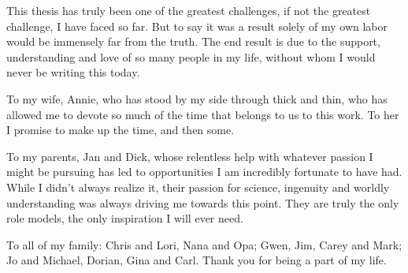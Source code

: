 
This thesis has truly been one of the greatest challenges, if not the greatest challenge, I have faced so far. But to say it was a result solely of my own labor would be immensely far from the truth. The end result is due to the support, understanding and love of so many people in my life, without whom I would never be writing this today.

To my wife, Annie, who has stood by my side through thick and thin, who has allowed me to devote so much of the time that belongs to us to this work. To her I promise to make up the time, and then some.

To my parents, Jan and Dick, whose relentless help with whatever passion I might be pursuing has led to opportunities I am incredibly fortunate to have had. While I didn't always realize it, their passion for science, ingenuity and worldly understanding was always driving me towards this point. They are truly the only role models, the only inspiration I will ever need.

To all of my family: Chris and Lori, Nana and Opa; Gwen, Jim, Carey and Mark; Jo and Michael, Dorian, Gina and Carl. Thank you for being a part of my life.